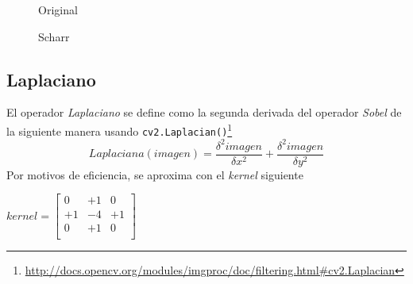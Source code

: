 \begin{figure}[H]
  \caption{Original}
  \centering \setlength\fboxsep{0pt} \setlength\fboxrule{0.5pt}
\end{figure}

\begin{figure}[H]
  \centering \setlength\fboxsep{0pt} \setlength\fboxrule{0.5pt}
  \caption{Scharr}
\end{figure}

\subsection{Laplaciano}
El operador \emph{Laplaciano} se define como la segunda derivada del
operador \emph{Sobel} de la siguiente manera usando
\texttt{cv2.Laplacian()}\footnote{\url{http://docs.opencv.org/modules/imgproc/doc/filtering.html\#cv2.Laplacian}}
\begin{equation*}
  Laplaciana(imagen) = \frac{\delta^{2} imagen}{\delta x^{2}} + \frac{\delta^{2} imagen}{\delta y^{2}}
\end{equation*}
Por motivos de eficiencia, se aproxima con el \emph{kernel} siguiente
\begin{center}
  $ kernel = \begin{bmatrix}
    0 & +1 & 0 \\
    +1 & -4 & +1 \\
    0 & +1 & 0 \\
  \end{bmatrix}
  $
\end{center}

